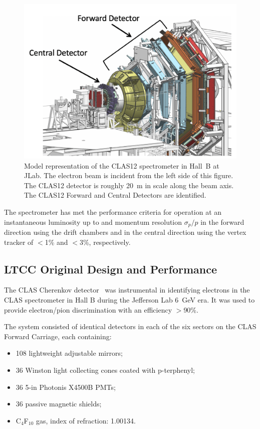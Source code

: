 \begin{figure}
    \centering
    \includegraphics[width=1.0\columnwidth,keepaspectratio]{img/clas12-model.png}
    \caption{ Model representation of the CLAS12 spectrometer in Hall~B at JLab. The electron beam is incident from
      the left side of this figure. The CLAS12 detector is roughly 20~m in scale along the beam axis. The CLAS12
      Forward and Central Detectors are identified.}
    \label{fig:clas12-model}
\end{figure}

The spectrometer has met the performance criteria for operation at an instantaneous luminosity up to \cLuminosity
and momentum resolution $\sigma_p/p$ in the forward direction using the drift chambers and in the central direction
using the vertex tracker of $<$1\% and $<$3\%, respectively.

\subsection{LTCC Original Design and Performance}

The CLAS Cherenkov detector~\cite{Adams:2001kk} was instrumental in identifying electrons in the CLAS
spectrometer in Hall B during the Jefferson Lab 6~GeV era. It was used to provide electron/pion discrimination
with an efficiency $>$90\%.

The system consisted of identical detectors in each of the six sectors on the CLAS Forward Carriage, each
containing:

\begin{itemize}
	\item 108 lightweight adjustable mirrors;
	\item 36 Winston light collecting cones coated with p-terphenyl;
	\item 36 5-in Photonis X4500B PMTs;
	\item 36 passive magnetic shields;
	\item C$_4$F$_{10}$ gas, index of refraction: 1.00134.
\end{itemize}

